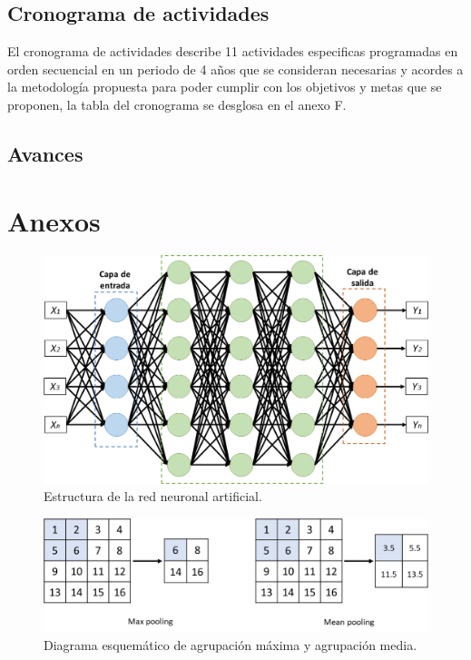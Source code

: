 \documentclass[11pt,a4paper,openany]{article}
\begin{document}
    \subsection{Cronograma de actividades}
    El cronograma de actividades describe 11 actividades especificas programadas en orden secuencial en un periodo de  4 años que se consideran necesarias y acordes a la metodología propuesta para poder cumplir con los objetivos y metas que se proponen, la tabla del cronograma se desglosa en el anexo F.

    \subsection{Avances}
    
\newpage


\printbibliography[heading=bibintoc,title={Bibliografia}]
\newpage


\section*{Anexos}


\begin{figure}[h]
            \centering
            \includegraphics[scale=0.6]{ANN.png} 
            \caption{Estructura de la red neuronal artificial. \label{Fig:ANN}}
        \end{figure}


\begin{figure}[h]
            \centering
            \includegraphics[scale=0.6]{Pooling.png} 
            \caption{Diagrama esquemático de agrupación máxima y agrupación media. \label{Fig:pool}}
        \end{figure}
\end{document}
